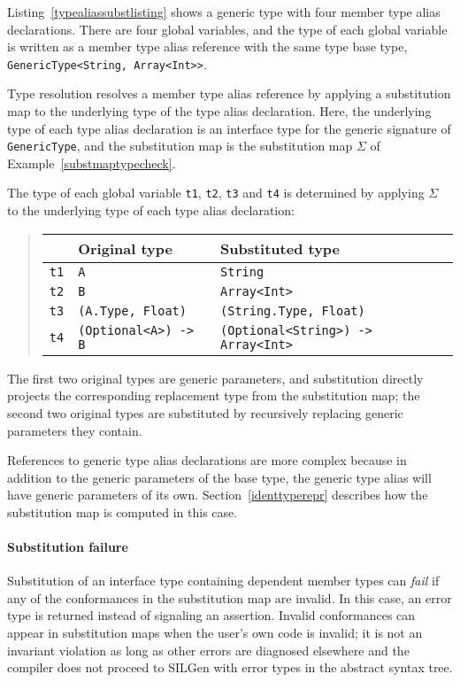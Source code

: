\documentclass[../generics]{subfiles}
\begin{document}
\begin{example} Listing~\ref{typealiassubstlisting} shows a generic type with four member type alias declarations. There are four global variables, and the type of each global variable is written as a member type alias reference with the same type base type, \texttt{GenericType<String, Array<Int>>}. 

Type resolution resolves a member type alias reference by applying a substitution map to the underlying type of the type alias declaration. Here, the underlying type of each type alias declaration is an interface type for the generic signature of \texttt{GenericType}, and the substitution map is the substitution map $\Sigma$ of Example~\ref{substmaptypecheck}.

The type of each global variable \texttt{t1}, \texttt{t2}, \texttt{t3} and \texttt{t4} is determined by applying $\Sigma$ to the underlying type of each type alias declaration:
\begin{quote}
\begin{tabular}{lll}
\toprule
&\textbf{Original type}&\textbf{Substituted type}\\
\midrule
\texttt{t1}&\texttt{A}&\texttt{String}\\
\texttt{t2}&\texttt{B}&\texttt{Array<Int>}\\
\texttt{t3}&\texttt{(A.Type, Float)}&\texttt{(String.Type, Float)}\\
\texttt{t4}&\texttt{(Optional<A>) -> B}&\texttt{(Optional<String>) -> Array<Int>}\\
\bottomrule
\end{tabular}
\end{quote}
The first two original types are generic parameters, and substitution directly projects the corresponding replacement type from the substitution map; the second two original types are substituted by recursively replacing generic parameters they contain.
\end{example}

References to generic type alias declarations are more complex because in addition to the generic parameters of the base type, the generic type alias will have generic parameters of its own. Section~\ref{identtyperepr} describes how the substitution map is computed in this case.

\paragraph{Substitution failure}
%
%
%
%
Substitution of an interface type containing dependent member types can \emph{fail} if any of the conformances in the substitution map are invalid. In this case, an error type is returned instead of signaling an assertion. Invalid conformances can appear in substitution maps when the user's own code is invalid; it is not an invariant violation as long as other errors are diagnosed elsewhere and the compiler does not proceed to SILGen with error types in the abstract syntax tree.
\end{document}
